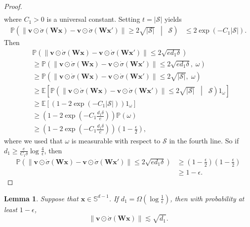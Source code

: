 \documentclass{article}
\newtheorem{lemma}[theorem]{Lemma}
\theoremstyle{definition}
\renewcommand{\P}{\mathbb{P}}
\newcommand{\E}{\mathbb{E}}
\newcommand{\mc}{\mathcal}
\renewcommand{\S}{\mathbb{S}}
\def\vv{{\bm{v}}}
\def\vx{{\bm{x}}}
\def\mW{{\bm{W}}}
\begin{document}
\begin{proof}
\begin{align*}
    \end{align*}
    where $C_1 > 0$ is a universal constant. Setting $t = |\mc{S}|$ yields
    \begin{align*}
        \P\left(\|\vv \odot \dot{\sigma}(\mW\vx) - \vv \odot \dot{\sigma}(\mW\vx')\| \geq 2\sqrt{|\mc{S}|} \;\; \middle| \;\; \mc{S} \right) &\leq 2\exp\left(-C_1|\mc{S}|\right).
    \end{align*}
    Then
    \begin{align*}
        &\P\left(\|\vv \odot \dot{\sigma}(\mW\vx) - \vv \odot \dot{\sigma}(\mW\vx')\| \leq 2\sqrt{ed_1 \delta}\right)
        \\&\geq\P\left(\|\vv \odot \dot{\sigma}(\mW\vx) - \vv \odot \dot{\sigma}(\mW\vx')\| \leq 2\sqrt{ed_1 \delta}  ,\; \omega \right) \\&\geq \P\left(\|\vv \odot \dot{\sigma}(\mW\vx) - \vv \odot \dot{\sigma}(\mW\vx')\| \leq 2\sqrt{|\mc{S}|}  ,\; \omega \right)
        \\&\geq \E\left[\P\left(\|\vv \odot \dot{\sigma}(\mW\vx) - \vv \odot \dot{\sigma}(\mW\vx')\| \leq 2\sqrt{|\mc{S}|}   \;\; \middle|\;\; \mc{S}\right)1_{\omega}\right]\\
        &\geq \E\left[\left(1 - 2\exp\left(-C_1|\mc{S}|\right)\right) 
 1_{\omega}\right]\\
 &\geq \left(1 - 2\exp\left(-C_1\frac{d_1 \delta}{e} \right)\right)\P(\omega)\\
 &\geq \left(1 - 2\exp\left(-C_1\frac{d_1 \delta}{e} \right)\right)\left(1 - \frac{\epsilon}{2}\right),
    \end{align*}
    where we used that $\omega$ is measurable with respect to $\mc{S}$ in the fourth line.  So if $d_1 \geq \frac{e}{C_1 \delta} \log \frac{4}{\epsilon}$, then
    \begin{align*}
        \P\left(\|\vv \odot \dot{\sigma}(\mW\vx) - \vv \odot \dot{\sigma}(\mW\vx')\| \leq 2\sqrt{ed_1 \delta}\right) &\geq \left(1 - \frac{\epsilon}{2}\right)\left(1 - \frac{\epsilon}{2}\right)\\
        &\geq 1 - \epsilon.
    \end{align*}
\end{proof}
\begin{lemma}\label{lemma:frob-bounds-diagonal}
    Suppose that $\vx \in \S^{d - 1}$. If $d_1 = \Omega\left(\log \frac{1}{\epsilon}\right)$, then with probability at least $1 - \epsilon$,
    \[\|\vv \odot \dot{\sigma}(\mW \vx)\| \lesssim \sqrt{d_1}. \]
\end{lemma}
\end{document}
